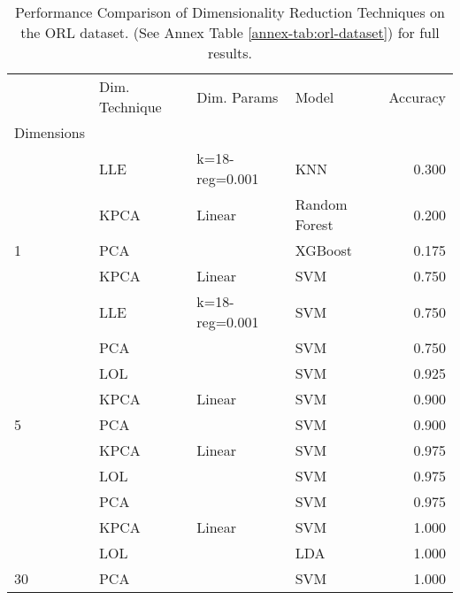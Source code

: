 \begin{table}[!ht]
    \begin{tabular}{llllr}
        \toprule
        {}                                       & Dim. Technique & Dim. Params    & Model         & Accuracy \\
        Dimensions                               &                &                &               &          \\
        \midrule
                                                 & LLE            & k=18-reg=0.001 & KNN           & 0.300    \\
                                                 & KPCA           & Linear         & Random Forest & 0.200    \\
        \multirow{-3}{*}{1}                      & PCA            &                & XGBoost       & 0.175    \\
        \rowcolor{lightgray}                     & KPCA           & Linear         & SVM           & 0.750    \\
        \rowcolor{lightgray}                     & LLE            & k=18-reg=0.001 & SVM           & 0.750    \\
        \rowcolor{lightgray}\multirow{-3}{*}{3}  & PCA            &                & SVM           & 0.750    \\
                                                 & LOL            &                & SVM           & 0.925    \\
                                                 & KPCA           & Linear         & SVM           & 0.900    \\
        \multirow{-3}{*}{5}                      & PCA            &                & SVM           & 0.900    \\
        \rowcolor{lightgray}                     & KPCA           & Linear         & SVM           & 0.975    \\
        \rowcolor{lightgray}                     & LOL            &                & SVM           & 0.975    \\
        \rowcolor{lightgray}\multirow{-3}{*}{15} & PCA            &                & SVM           & 0.975    \\
                                                 & KPCA           & Linear         & SVM           & 1.000    \\
                                                 & LOL            &                & LDA           & 1.000    \\
        \multirow{-3}{*}{30}                     & PCA            &                & SVM           & 1.000    \\
        \bottomrule
    \end{tabular}
    \caption{Performance Comparison of Dimensionality Reduction Techniques on the ORL dataset. (See Annex Table \ref{annex-tab:orl-dataset}) for full results.}
    \label{tab:orl-dataset}
\end{table}

